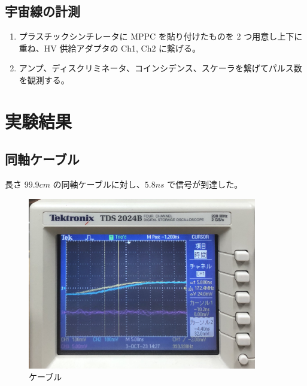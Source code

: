 \documentclass[uplatex,dvipdfmx,a4paper,11pt]{jlreq}
\numberwithin{equation}{section}
\theoremstyle{definition}
\begin{document}
\subsection{宇宙線の計測}
\begin{enumerate}
  \item プラスチックシンチレータに MPPC を貼り付けたものを 2 つ用意し上下に重ね、HV 供給アダプタの Ch1, Ch2 に繋げる。
  \item アンプ、ディスクリミネータ、コインシデンス、スケーラを繋げてパルス数を観測する。
\end{enumerate}



\section{実験結果}
\subsection{同軸ケーブル}
長さ $99.9\si{cm}$ の同軸ケーブルに対し、$5.8\si{ns}$ で信号が到達した。
\begin{figure}[htbp]
  \centering
  \includegraphics[width=10cm]{./assets/cable_diff_time.jpg}
  \caption{ケーブル}
  \label{fig:cable diff time}
\end{figure}
\end{document}
